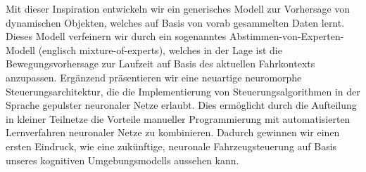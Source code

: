 Mit dieser Inspiration entwickeln wir ein generisches Modell zur Vorhersage von dynamischen Objekten, welches auf Basis von vorab gesammelten Daten lernt.
Dieses Modell verfeinern wir durch ein sogenanntes Abstimmen-von-Experten-Modell (englisch mixture-of-experts), welches in der Lage ist die Bewegungsvorhersage zur Laufzeit auf Basis des aktuellen Fahrkontexts anzupassen.
Erg\"anzend pr\"asentieren wir eine neuartige neuromorphe Steuerungsarchitektur, die die Implementierung von Steuerungsalgorithmen in der Sprache gepulster neuronaler Netze erlaubt.
Dies erm\"oglicht durch die Aufteilung in kleiner Teilnetze die Vorteile manueller Programmierung mit automatisierten Lernverfahren neuronaler Netze zu kombinieren.
Dadurch gewinnen wir einen ersten Eindruck, wie eine zuk\"unftige, neuronale Fahrzeugsteuerung auf Basis unseres kognitiven Umgebungsmodells aussehen kann.
